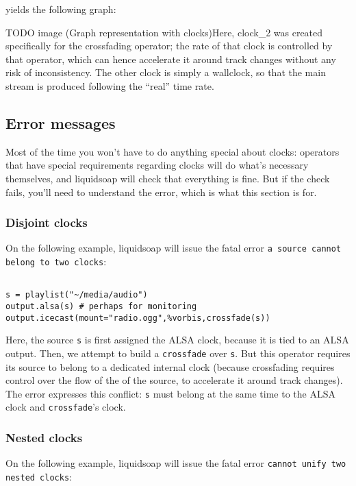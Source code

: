 yields the following graph:

TODO image (Graph representation with clocks)Here, clock\_2 was created specifically for the crossfading
operator; the rate of that clock is controlled by that operator,
which can hence accelerate it around track changes without any
risk of inconsistency.
The other clock is simply a wallclock, so that the main stream
is produced following the ``real'' time rate.

\subsection{Error messages}
Most of the time you won't have to do anything special about clocks:
operators that have special requirements regarding clocks will do
what's necessary themselves, and liquidsoap will check that everything is 
fine. But if the check fails, you'll need to understand the error,
which is what this section is for.

\subsubsection{Disjoint clocks}
On the following example, liquidsoap will issue the fatal error
\verb+a source cannot belong to two clocks+:

\begin{verbatim}

s = playlist("~/media/audio")
output.alsa(s) # perhaps for monitoring
output.icecast(mount="radio.ogg",%vorbis,crossfade(s))
\end{verbatim}
Here, the source \verb+s+ is first assigned the ALSA clock,
because it is tied to an ALSA output.
Then, we attempt to build a \verb+crossfade+ over \verb+s+.
But this operator requires its source to belong to a dedicated
internal clock (because crossfading requires control over the flow
of the of the source, to accelerate it around track changes).
The error expresses this conflict:
\verb+s+ must belong at the same time to the ALSA clock
and \verb+crossfade+'s clock.

\subsubsection{Nested clocks}
On the following example, liquidsoap will issue the fatal error
\verb+cannot unify two nested clocks+:

